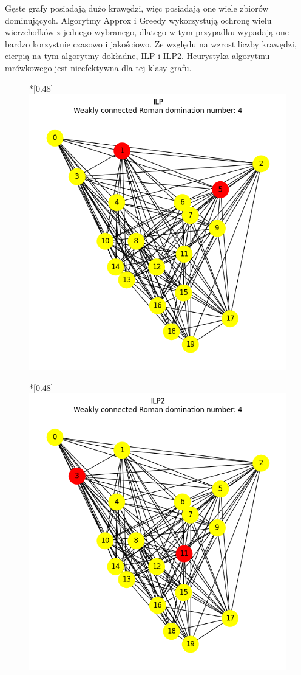     Gęste grafy posiadają dużo krawędzi, więc posiadają one wiele zbiorów dominujących. Algorytmy Approx i Greedy wykorzystują ochronę wielu wierzchołków z jednego wybranego, dlatego w tym przypadku wypadają one bardzo korzystnie czasowo i jakościowo. Ze względu na wzrost liczby krawędzi, cierpią na tym algorytmy dokładne, ILP i ILP2. Heurystyka algorytmu mrówkowego jest nieefektywna dla tej klasy grafu.

    \begin{figure}[H]
        \centering
        \begin{subcaptionbox}*{}[0.48\linewidth]
            {\includegraphics[width=0.75\linewidth]{assets/plots/ILP/ErdosRenyi_dense_n20_i2_results.png}}
        \end{subcaptionbox}
        \hfill
        \begin{subcaptionbox}*{}[0.48\linewidth]
            {\includegraphics[width=0.75\linewidth]{assets/plots/ILP2/ErdosRenyi_dense_n20_i2_results.png}}

\end{subcaptionbox}
\end{figure}

